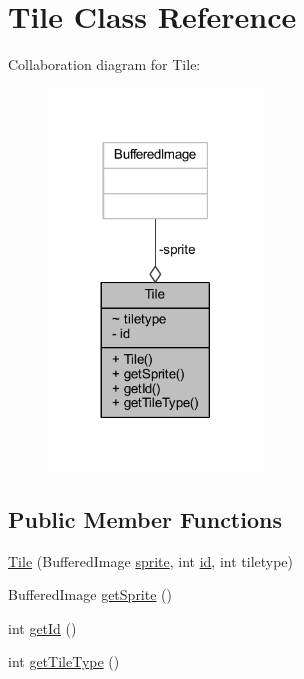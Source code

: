 \hypertarget{classblocchi_1_1_tile}{}\section{Tile Class Reference}
\label{classblocchi_1_1_tile}


Collaboration diagram for Tile\+:
\nopagebreak
\begin{figure}[H]
\begin{center}
\leavevmode
\includegraphics[width=161pt]{classblocchi_1_1_tile__coll__graph}
\end{center}
\end{figure}
\subsection*{Public Member Functions}
\begin{DoxyCompactItemize}
\item 
\hyperlink{classblocchi_1_1_tile_acbf8ab43b0cee998ab5f07f76d55fdee}{Tile} (Buffered\+Image \hyperlink{classblocchi_1_1_tile_a596d0c3eea54a08f78cbad0a4fbec565}{sprite}, int \hyperlink{classblocchi_1_1_tile_a7441ef0865bcb3db9b8064dd7375c1ea}{id}, int tiletype)
\item 
Buffered\+Image \hyperlink{classblocchi_1_1_tile_ac51c0c8c26d79dc6df726b968276afb2}{get\+Sprite} ()
\item 
int \hyperlink{classblocchi_1_1_tile_a67283be3f45257d1e0c474c563ebb6b6}{get\+Id} ()
\item 
int \hyperlink{classblocchi_1_1_tile_a19996fc03739127aa64afbd2f49c2a7c}{get\+Tile\+Type} ()
\end{DoxyCompactItemize}
